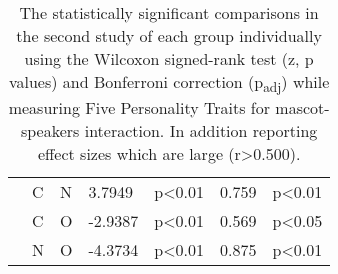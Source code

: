 \begin{table}
\begin{center}
\begin{tabular}{ |p{2.5cm}| p{0.5cm}|p{0.5cm}|p{1.3cm}| p{1.7cm}|p{1cm}|p{1.7cm}|  }
            &C &N &3.7949 &p<0.01 & 0.759 &p<0.01\\
            &C &O &-2.9387 &p<0.01 & 0.569 &p<0.05\\
            &N &O &-4.3734 &p<0.01 & 0.875 &p<0.01\\
            \hline
        \end{tabular}
    \end{center}
    \captionsetup{width=13.5cm}
    \caption{The statistically significant comparisons in the second study of each group individually using the Wilcoxon
    signed-rank test (z, p values) and Bonferroni correction (p\textsubscript{adj}) while measuring Five Personality Traits for mascot-speakers interaction.
    In addition reporting effect sizes which are large (r>0.500).}
    \label{table:wilcoxMS2}
\end{table}

